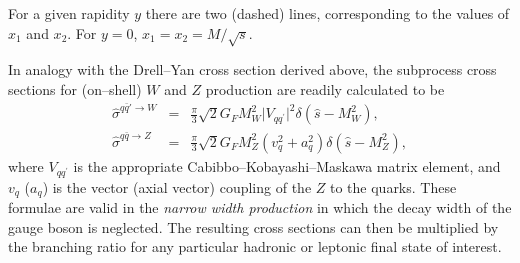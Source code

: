 \documentclass[12pt]{iopart}
\def\beqn{\begin{eqnarray}}
\def\eeqn{\end{eqnarray}}
\begin{document}
%
For a given rapidity $y$ there are two (dashed) lines, corresponding to the values of $x_1$
and $x_2$. For $y=0$, $x_1 = x_2 = M/\sqrt{s}$. 

In analogy with the Drell--Yan cross section derived above,
the subprocess cross sections for (on--shell) $W$ and $Z$ production are readily
calculated to be
\beqn
\hat{\sigma}^{q\bar{q}'\rightarrow W}&=& 
\frac{\pi}{3} \sqrt{2} G_F M_W^2 \vert V_{q q^\prime} \vert^2
\delta (\hat{s} -M_W^2) , \nonumber \\
\hat{\sigma}^{q\bar{q}\rightarrow Z}&=& \frac{\pi }{3}
\sqrt{2} G_F M_Z^2 (v_q^2+a_q^2) 
\delta (\hat{s} -M_Z^2),
\label{eq:WZlo}
\eeqn
where $V_{q q^\prime}$ is the appropriate  Cabibbo--Kobayashi--Maskawa matrix element, and $v_q$ ($a_q$) is the
vector (axial vector) coupling of the $Z$ to the quarks. These formulae are valid in the {\it narrow width
production} in which  the decay width of the gauge boson is neglected. The resulting cross sections can then be
multiplied by the branching ratio for any particular hadronic or leptonic final state of interest.
\end{document}
